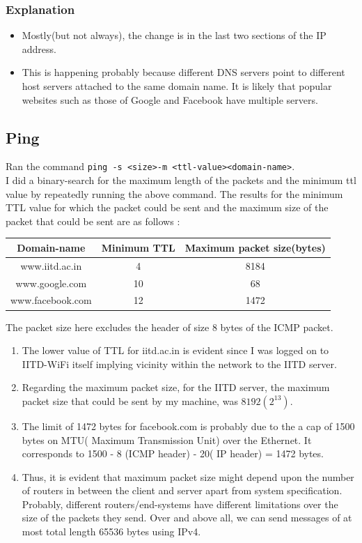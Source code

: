 \documentclass[a4paper]{article}
\begin{document}
\subsubsection{Explanation}
\begin{itemize}
    \item Mostly(but not always), the change is in the last two sections of the IP address.
    \item This is happening probably because different DNS servers point to different host servers attached to the same domain name. It is likely that popular websites such as those of Google and Facebook have multiple servers.
\end{itemize}
\subsection{Ping}
Ran the command \texttt{ping -s \textless size\textgreater  -m \textless ttl-value\textgreater  \textless domain-name\textgreater}. \\
I did a binary-search for the maximum length of the packets and the minimum ttl value by repeatedly running the above command. 
The results for the minimum TTL value for which the packet could be sent and the maximum size of the packet that could be sent are as follows :
\begin{center}
    \begin{tabular}{|c|c|c|}
        \hline
        Domain-name & Minimum TTL  & Maximum packet size(bytes)  \\
        \hline
        www.iitd.ac.in & 4  & 8184 \\
        \hline
        www.google.com &  10   & 68  \\ 
        \hline
        www.facebook.com    &  12  & 1472  \\  
        \hline
    \end{tabular}
\end{center}
The packet size here excludes the header of size 8 bytes of the ICMP packet.
\begin{enumerate}
    \item The lower value of TTL for iitd.ac.in is evident since I was logged on to IITD-WiFi itself implying vicinity within the network to the IITD server. 
    \item Regarding the maximum packet size, for the IITD server, the maximum packet size  that could be sent by my machine, was $8192(2^{13})$. 
    \item The limit of 1472 bytes for facebook.com is probably due to the a cap of 1500 bytes on MTU( Maximum Transmission Unit) over the Ethernet. It corresponds to 1500 - 8 (ICMP header) - 20( IP header) = 1472 bytes.
    \item Thus, it is evident that maximum packet size might depend upon the number of routers in between the client and server apart from system specification. Probably, different routers/end-systems have different limitations over the size of the packets they send. Over and above all, we can send messages of at most total length 65536 bytes using IPv4.
\end{enumerate}
\end{document}
